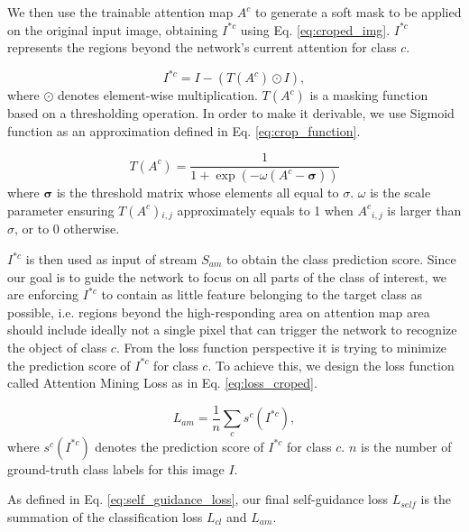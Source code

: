 \documentclass[10pt,twocolumn,letterpaper]{article}
\begin{document}
We then use the trainable attention map $A^c$ to generate a soft mask to be applied on the original input image, obtaining $I^ {*c}$ using Eq. \ref{eq:croped_img}. $I^ {*c}$ represents the regions beyond the network's current attention for class $c$.



\begin{equation}
\label{eq:croped_img}
{I^ {*c} } = I - \left( T\left( {{A^c}} \right) \odot I \right),
\end{equation}
where $\odot$ denotes element-wise multiplication. $T\left( {{A^c}} \right)$ is a masking function based on a thresholding operation. In order to make it derivable, we use Sigmoid function as an approximation defined in Eq. \ref{eq:crop_function}.

\begin{equation}
\label{eq:crop_function}
T\left( {{A^c}} \right) = \frac{1}{{1 + \exp \left( { - \omega \left( {{A^c} -  \boldsymbol{\sigma} } \right)} \right)}}
\end{equation}
where $\boldsymbol{\sigma}$ is the threshold matrix whose elements all equal to $\sigma$. $\omega$ is the scale parameter ensuring $T\left( {{A^c}} \right){}_{i,j}$ approximately equals to 1 when ${A^c}_{i,j}$ is larger than $\sigma$, or to 0 otherwise.



$I^ {*c}$ is then used as input of stream ${S_{am}}$ to obtain the class prediction score. Since our goal is to guide the network to focus on all parts of the class of interest, we are enforcing $I^ {*c}$ to contain as little feature belonging to the target class as possible, i.e. regions beyond the high-responding area on attention map area should include ideally not a single pixel that can trigger the network to recognize the object of class $c$. From the loss function perspective it is trying to minimize the prediction score of $I^ {*c}$ for class $c$. To achieve this, we design the loss function called Attention Mining Loss as in Eq. \ref{eq:loss_croped}.



\begin{equation}
\label{eq:loss_croped}
{L_{am}} = \frac{1}{n}\sum\limits_c {{s^c}({I^{*c}})},
\end{equation}
where ${{s^c}({I^{*c}})}$ denotes the prediction score of $I^ {*c}$ for class $c$.  $n$ is the number of ground-truth class labels for this image $I$.

As defined in Eq. \ref{eq:self_guidance_loss}, our final self-guidance loss $L_{self}$ is the summation of the classification loss $L_{cl}$ and $L_{am}$.
\end{document}
